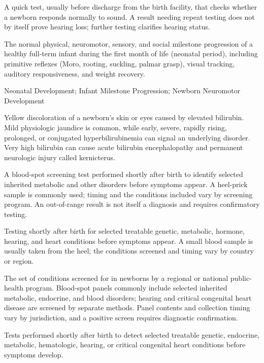  A quick test, usually before discharge from the birth facility, that checks whether a newborn responds normally to sound. A result needing repeat testing does not by itself prove hearing loss; further testing clarifies hearing status.

 The normal physical, neuromotor, sensory, and social milestone progression of a healthy full-term infant during the first month of life (neonatal period), including primitive reflexes (Moro, rooting, suckling, palmar grasp), visual tracking, auditory responsiveness, and weight recovery.

\synonyms
Neonatal Development; Infant Milestone Progression; Newborn Neuromotor Development

 Yellow discoloration of a newborn's skin or eyes caused by elevated bilirubin.
Mild physiologic jaundice is common, while early, severe, rapidly rising, prolonged, or conjugated
hyperbilirubinemia can signal an underlying disorder. Very high bilirubin can cause acute bilirubin
encephalopathy and permanent neurologic injury called kernicterus.

 A blood-spot screening test performed shortly after birth to identify selected inherited metabolic and other disorders before symptoms appear. A heel-prick sample is commonly used; timing and the conditions included vary by screening program. An out-of-range result is not itself a diagnosis and requires confirmatory testing.

 Testing shortly after birth for selected treatable genetic, metabolic, hormone, hearing, and heart conditions before symptoms appear. A small blood sample is usually taken from the heel; the conditions screened and timing vary by country or region.

 The set of conditions screened for in newborns by a regional or national public-health program. Blood-spot panels commonly include selected inherited metabolic, endocrine, and blood disorders; hearing and critical congenital heart disease are screened by separate methods. Panel contents and collection timing vary by jurisdiction, and a positive screen requires diagnostic confirmation.

 Tests performed shortly after birth to detect selected treatable genetic, endocrine, metabolic, hematologic, hearing, or critical congenital heart conditions before symptoms develop.

